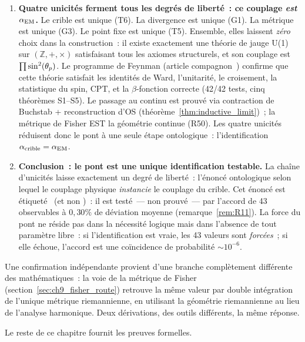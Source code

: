 \documentclass[12pt,a4paper]{article}
\begin{document}
\begin{tcolorbox}[colback=thmblue!5, colframe=thmblue!60, title={\textbf{L'argument en cinq étapes}}]
\begin{enumerate}[leftmargin=*, label=\textbf{\arabic*.}]
\item \textbf{Quatre unicités ferment tous les degrés de liberté~: ce
  couplage \emph{est} $\alpha_{\mathrm{EM}}$.}
  Le crible est unique (T6). La divergence est unique (G1). La
  métrique est unique (G3). Le point fixe est unique (T5). Ensemble,
  elles laissent \emph{zéro} choix dans la construction~: il existe
  exactement une théorie de jauge U(1) sur $(\mathbb{Z}, +, \times)$
  satisfaisant tous les axiomes structurels, et son couplage est
  $\prod \sin^2(\theta_{p})$. Le programme de Feynman (article
  compagnon~\cite{companion_physics}) confirme que cette théorie
  satisfait les identités de Ward, l'unitarité, le croisement, la
  statistique du spin, CPT, et la $\beta$-fonction correcte (42/42
  tests, cinq théorèmes S1--S5). Le passage au continu est prouvé via
  contraction de Buchstab + reconstruction d'OS
  (théorème~\ref{thm:inductive_limit})~; la métrique de Fisher EST la
  géométrie continue (R50). Les quatre unicités réduisent donc le
  pont à une seule étape ontologique~: l'identification
  $\alpha_{\rm crible} = \alpha_{\mathrm{EM}}$.

\item \textbf{Conclusion~: le pont est une unique identification testable.}
  La chaîne d'unicités laisse exactement un degré de liberté~:
  l'énoncé ontologique selon lequel le couplage physique
  \emph{instancie} le couplage du crible. Cet énoncé est étiqueté
  \BRIDGETAG\ (et non \THMTAG)~: il est testé~--- non prouvé~--- par
  l'accord de 43 observables à $0{,}30\%$ de déviation moyenne
  (remarque~\ref{rem:R11}). La force du pont ne réside pas dans la
  nécessité logique mais dans l'absence de tout paramètre libre~: si
  l'identification est vraie, les 43 valeurs sont \emph{forcées}~;
  si elle échoue, l'accord est une coïncidence de probabilité
  $\sim 10^{-6}$.
\end{enumerate}
\end{tcolorbox}

\medskip\noindent
Une confirmation indépendante provient d'une branche complètement
différente des mathématiques~: la voie de la métrique de Fisher
(section~\ref{sec:ch9_fisher_route}) retrouve la même valeur par
double intégration de l'unique métrique riemannienne, en utilisant
la géométrie riemannienne au lieu de l'analyse harmonique. Deux
dérivations, des outils différents, la même réponse.

\medskip\noindent
Le reste de ce chapitre fournit les preuves formelles.

\end{document}
